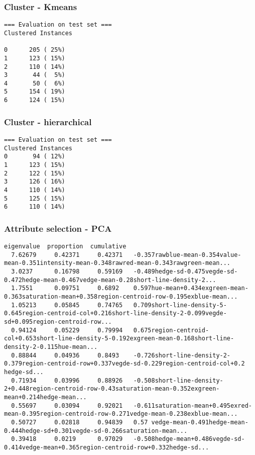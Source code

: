 \documentclass[a4paper]{article}
\begin{document}
\subsubsection{Cluster - Kmeans}
\begin{verbatim}
=== Evaluation on test set ===
Clustered Instances

0      205 ( 25%)
1      123 ( 15%)
2      110 ( 14%)
3       44 (  5%)
4       50 (  6%)
5      154 ( 19%)
6      124 ( 15%)
\end{verbatim}

\subsubsection{Cluster - hierarchical}
\begin{verbatim}
=== Evaluation on test set ===
Clustered Instances
0       94 ( 12%)
1      123 ( 15%)
2      122 ( 15%)
3      126 ( 16%)
4      110 ( 14%)
5      125 ( 15%)
6      110 ( 14%)
\end{verbatim}


\subsubsection{Attribute selection - PCA}

\begin{verbatim}
eigenvalue	proportion	cumulative
  7.62679	  0.42371	  0.42371	-0.357rawblue-mean-0.354value-mean-0.351intensity-mean-0.348rawred-mean-0.343rawgreen-mean...
  3.0237 	  0.16798	  0.59169	-0.489hedge-sd-0.475vegde-sd-0.472hedge-mean-0.467vedge-mean-0.28short-line-density-2...
  1.7551 	  0.09751	  0.6892 	0.597hue-mean+0.434exgreen-mean-0.363saturation-mean+0.358region-centroid-row-0.195exblue-mean...
  1.05213	  0.05845	  0.74765	0.709short-line-density-5-0.645region-centroid-col+0.216short-line-density-2-0.099vegde-sd+0.095region-centroid-row...
  0.94124	  0.05229	  0.79994	0.675region-centroid-col+0.653short-line-density-5-0.192exgreen-mean-0.168short-line-density-2-0.115hue-mean...
  0.88844	  0.04936	  0.8493 	-0.726short-line-density-2-0.379region-centroid-row+0.337vegde-sd-0.229region-centroid-col+0.2  hedge-sd...
  0.71934	  0.03996	  0.88926	-0.508short-line-density-2+0.448region-centroid-row-0.43saturation-mean-0.352exgreen-mean+0.214hedge-mean...
  0.55697	  0.03094	  0.92021	-0.611saturation-mean+0.495exred-mean-0.395region-centroid-row-0.271vedge-mean-0.238exblue-mean...
  0.50727	  0.02818	  0.94839	0.57 vedge-mean-0.491hedge-mean-0.444hedge-sd+0.301vegde-sd-0.266saturation-mean...
  0.39418	  0.0219 	  0.97029	-0.508hedge-mean+0.486vegde-sd-0.414vedge-mean+0.365region-centroid-row+0.332hedge-sd...
\end{verbatim}
\end{document}
